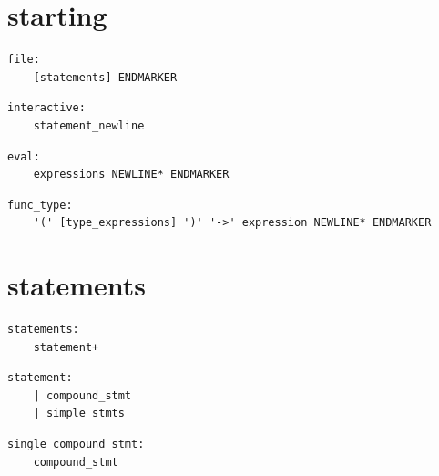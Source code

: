 
\section{starting}

\noindent\textbf{\texttt{}}\par
\begin{lstlisting}
file:
    [statements] ENDMARKER
\end{lstlisting}

\noindent\textbf{\texttt{}}\par
\begin{lstlisting}
interactive:
    statement_newline
\end{lstlisting}

\noindent\textbf{\texttt{}}\par
\begin{lstlisting}
eval:
    expressions NEWLINE* ENDMARKER
\end{lstlisting}

\noindent\textbf{\texttt{}}\par
\begin{lstlisting}
func_type:
    '(' [type_expressions] ')' '->' expression NEWLINE* ENDMARKER
\end{lstlisting}

\section{statements}

\noindent\textbf{\texttt{}}\par
\begin{lstlisting}
statements:
    statement+
\end{lstlisting}

\noindent\textbf{\texttt{}}\par
\begin{lstlisting}
statement:
    | compound_stmt
    | simple_stmts
\end{lstlisting}

\noindent\textbf{\texttt{}}\par
\begin{lstlisting}
single_compound_stmt:
    compound_stmt
\end{lstlisting}

